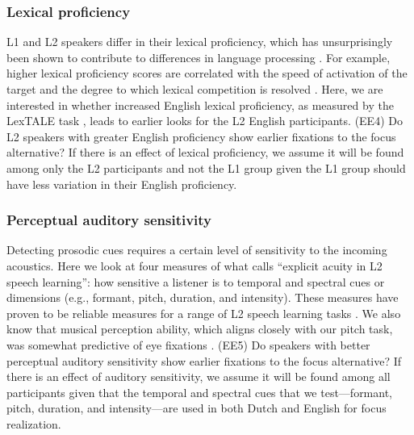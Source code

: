 \subsubsection{Lexical proficiency}
L1 and L2 speakers differ in their lexical proficiency, which has unsurprisingly been shown to contribute to differences in language processing \parencite{Yap2012, zareva2005relationship}. For example, higher lexical proficiency scores are correlated with the speed of activation of the target and the degree to which lexical competition is resolved \parencite{sarrett2022within}. Here, we are interested in whether increased English lexical proficiency, as measured by the LexTALE task \parencite{lemhofer2012introducing}, leads to earlier looks for the L2 English participants. (EE4) Do L2 speakers with greater English proficiency show earlier fixations to the focus alternative? If there is an effect of lexical proficiency, we assume it will be found among only the L2 participants and not the L1 group given the L1 group should have less variation in their English proficiency.

 

\subsubsection{Perceptual auditory sensitivity}
Detecting prosodic cues requires a certain level of sensitivity to the incoming acoustics. Here we look at four measures of what \textcite{saito2023does} calls “explicit acuity in L2 speech learning”: how sensitive a listener is to temporal and spectral cues or dimensions (e.g., formant,
pitch, duration, and intensity). These measures have proven to be reliable measures for a range of L2 speech learning tasks \parencite{Kachlicka_Saito_Tierney_2019, saito2024auditory, bakkouche2025effects, bramlett_wiener_24_speechprosody}. We also know that musical perception ability, which aligns closely with our pitch task, was somewhat predictive of eye fixations \textcite{jansen2023influence}. (EE5) Do speakers with better perceptual auditory sensitivity show earlier fixations to the focus alternative? If there is an effect of auditory sensitivity, we assume it will be found among all participants given that the temporal and spectral cues  that we test---formant, pitch, duration, and intensity---are used in both Dutch and English for focus realization.


